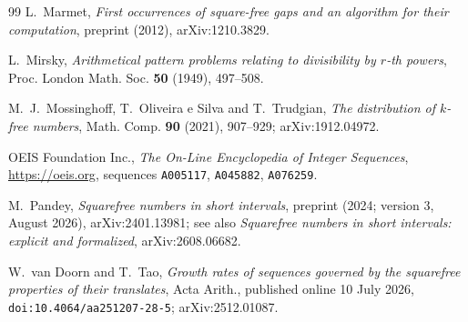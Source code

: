 \documentclass[11pt,reqno]{amsart}
\theoremstyle{plain}
\theoremstyle{definition}
\numberwithin{equation}{section}
\begin{document}
\begin{thebibliography}{99}
L.~Marmet,
\emph{First occurrences of square-free gaps and an algorithm for their computation},
preprint (2012), arXiv:1210.3829.

L.~Mirsky,
\emph{Arithmetical pattern problems relating to divisibility by $r$-th powers},
Proc. London Math. Soc. \textbf{50} (1949), 497--508.

M.~J.~Mossinghoff, T.~Oliveira e Silva and T.~Trudgian,
\emph{The distribution of $k$-free numbers},
Math. Comp. \textbf{90} (2021), 907--929; arXiv:1912.04972.

OEIS Foundation Inc.,
\emph{The On-Line Encyclopedia of Integer Sequences},
\url{https://oeis.org}, sequences \texttt{A005117}, \texttt{A045882}, \texttt{A076259}.

M.~Pandey,
\emph{Squarefree numbers in short intervals},
preprint (2024; version 3, August 2026), arXiv:2401.13981; see also
\emph{Squarefree numbers in short intervals: explicit and formalized},
arXiv:2608.06682.

W.~van Doorn and T.~Tao,
\emph{Growth rates of sequences governed by the squarefree properties of their
translates},
Acta Arith., published online 10 July 2026, \texttt{doi:10.4064/aa251207-28-5};
arXiv:2512.01087.

\end{thebibliography}
\end{document}
